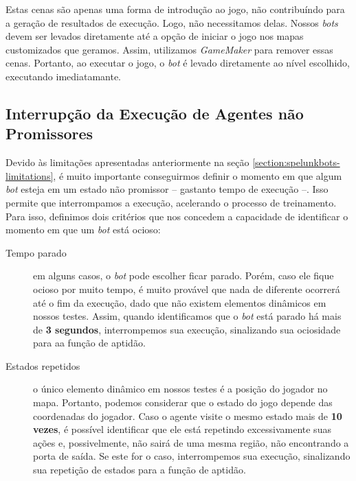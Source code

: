 Estas cenas são apenas uma forma de introdução ao jogo, não contribuíndo para a
geração de resultados de execução. Logo, não necessitamos delas. Nossos
\textit{bots} devem ser levados diretamente até a opção de iniciar o jogo nos
mapas customizados que geramos.  Assim, utilizamos \textit{GameMaker} para
remover essas cenas. Portanto, ao executar o jogo, o \textit{bot} é levado
diretamente ao nível escolhido, executando imediatamante.

\subsection{Interrupção da Execução de Agentes não Promissores}

Devido às limitações apresentadas anteriormente na seção
\ref{section:spelunkbots-limitations}, é muito importante conseguirmos definir o
momento em que algum \textit{bot} esteja em um estado não promissor -- gastanto
tempo de execução --. Isso permite que interrompamos a execução, acelerando o
processo de treinamento.  Para isso, definimos dois critérios que nos concedem a
capacidade de identificar o momento em que um \textit{bot} está ocioso:

\begin{description}
	\item [Tempo parado] em alguns casos, o \textit{bot} pode escolher ficar
		parado. Porém, caso ele fique ocioso por muito tempo, é muito provável
		que nada de diferente ocorrerá até o fim da execução, dado que não
		existem elementos dinâmicos em nossos testes. Assim, quando
		identificamos que o \textit{bot} está parado há mais de \textbf{3
		segundos}, interrompemos sua execução, sinalizando sua ociosidade para
		aa função de aptidão.

	\item [Estados repetidos] o único elemento dinâmico em nossos testes é a
		posição do jogador no mapa. Portanto, podemos considerar que o estado do
		jogo depende das coordenadas do jogador. Caso o agente visite o mesmo
		estado mais de \textbf{10 vezes}, é possível identificar que ele está
		repetindo excessivamente suas ações e, possivelmente, não sairá de uma
		mesma região, não encontrando a porta de saída. Se este for o caso,
		interrompemos sua execução, sinalizando sua repetição de estados para a
		função de aptidão.
\end{description}


